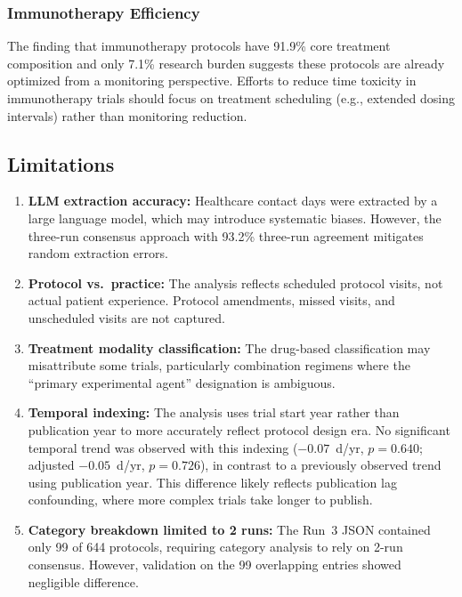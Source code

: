 \documentclass[11pt,a4paper]{article}
\begin{document}
\subsubsection{Immunotherapy Efficiency}

The finding that immunotherapy protocols have 91.9\% core treatment composition and only 7.1\% research burden suggests these protocols are already optimized from a monitoring perspective. Efforts to reduce time toxicity in immunotherapy trials should focus on treatment scheduling (e.g., extended dosing intervals) rather than monitoring reduction.

\subsection{Limitations}

\begin{enumerate}
    \item \textbf{LLM extraction accuracy:} Healthcare contact days were extracted by a large language model, which may introduce systematic biases. However, the three-run consensus approach with 93.2\% three-run agreement mitigates random extraction errors.

    \item \textbf{Protocol vs.\ practice:} The analysis reflects scheduled protocol visits, not actual patient experience. Protocol amendments, missed visits, and unscheduled visits are not captured.

    \item \textbf{Treatment modality classification:} The drug-based classification may misattribute some trials, particularly combination regimens where the ``primary experimental agent'' designation is ambiguous.

    \item \textbf{Temporal indexing:} The analysis uses trial start year rather than publication year to more accurately reflect protocol design era. No significant temporal trend was observed with this indexing ($-0.07$~d/yr, $p=0.640$; adjusted $-0.05$~d/yr, $p=0.726$), in contrast to a previously observed trend using publication year. This difference likely reflects publication lag confounding, where more complex trials take longer to publish.

    \item \textbf{Category breakdown limited to 2 runs:} The Run~3 JSON contained only 99 of 644 protocols, requiring category analysis to rely on 2-run consensus. However, validation on the 99 overlapping entries showed negligible difference.


\end{enumerate}
\end{document}
